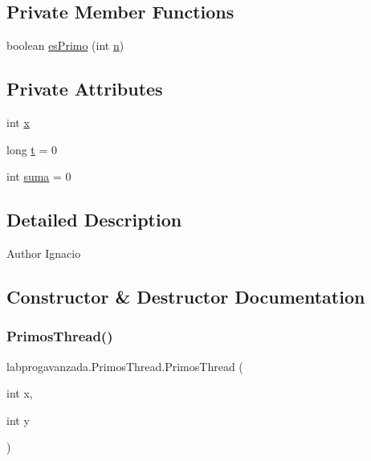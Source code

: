 \subsection*{Private Member Functions}
\begin{DoxyCompactItemize}
\item 
boolean \mbox{\hyperlink{classlabprogavanzada_1_1_primos_thread_a25df76b6f0e4824a861b0ca98b623d22}{es\+Primo}} (int \mbox{\hyperlink{classlabprogavanzada_1_1_primos_thread_ae273c3f9736419431b182efcc4e1be3d}{n}})
\end{DoxyCompactItemize}
\subsection*{Private Attributes}
\begin{DoxyCompactItemize}
\item 
int \mbox{\hyperlink{classlabprogavanzada_1_1_primos_thread_a32c2a35f28ba168dd13573c0b2987a35}{x}}
\item 
long \mbox{\hyperlink{classlabprogavanzada_1_1_primos_thread_a23637a099211681b444b018baf22fb1f}{t}} = 0
\item 
int \mbox{\hyperlink{classlabprogavanzada_1_1_primos_thread_a3eb92a6111e73ae51fe335a5232f2a65}{suma}} = 0
\end{DoxyCompactItemize}


\subsection{Detailed Description}
\begin{DoxyAuthor}{Author}
Ignacio 
\end{DoxyAuthor}


\subsection{Constructor \& Destructor Documentation}
\mbox{\label{classlabprogavanzada_1_1_primos_thread_aec27417536b36a2e8b17e87bc3ffb812}} 
\subsubsection{\texorpdfstring{Primos\+Thread()}{PrimosThread()}}
{\footnotesize\ttfamily labprogavanzada.\+Primos\+Thread.\+Primos\+Thread (\begin{DoxyParamCaption}\item[{int}]{x,  }\item[{int}]{y }\end{DoxyParamCaption})\hspace{0.3cm}{\ttfamily [inline]}}


